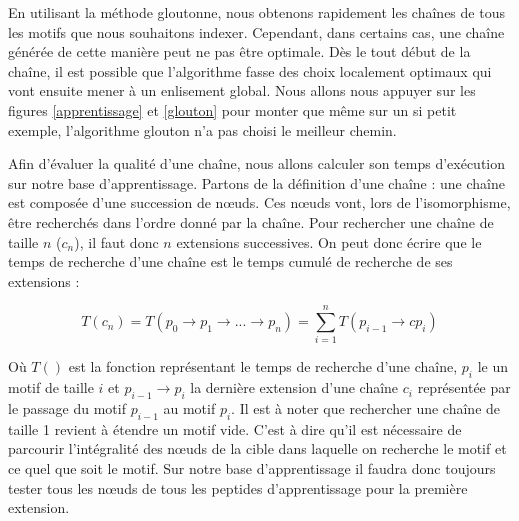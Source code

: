 En utilisant la méthode gloutonne, nous obtenons rapidement les chaînes de tous les motifs que nous souhaitons indexer.
Cependant, dans certains cas, une chaîne générée de cette manière peut ne pas être optimale.
Dès le tout début de la chaîne, il est possible que l'algorithme fasse des choix localement optimaux qui vont ensuite mener à un enlisement global.
Nous allons nous appuyer sur les figures \ref{apprentissage} et \ref{glouton} pour monter que même sur un si petit exemple, l'algorithme glouton n'a pas choisi le meilleur chemin.

Afin d'évaluer la qualité d'une chaîne, nous allons calculer son temps d'exécution sur notre base d'apprentissage.
Partons de la définition d'une chaîne : une chaîne est composée d'une succession de n\oe{}uds.
Ces n\oe{}uds vont, lors de l'isomorphisme, être recherchés dans l'ordre donné par la chaîne.
Pour rechercher une chaîne de taille $n$ ($c_n$), il faut donc $n$ extensions successives.
On peut donc écrire que le temps de recherche d'une chaîne est le temps cumulé de recherche de ses extensions :

\begin{equation}
 T(c_n) = T(p_0 \rightarrow p_1 \rightarrow ... \rightarrow p_n) = \sum_{i=1}^n T(p_{i-1} \rightarrow cp_i)
\end{equation}

Où $T()$ est la fonction représentant le temps de recherche d'une chaîne, $p_i$ le un motif de taille $i$ et $p_{i-1} \rightarrow p_i$ la dernière extension d'une chaîne $c_i$ représentée par le passage du motif $p_{i-1}$ au motif $p_i$.
Il est à noter que rechercher une chaîne de taille 1 revient à étendre un motif vide.
C'est à dire qu'il est nécessaire de parcourir l'intégralité des n\oe{}uds de la cible dans laquelle on recherche le motif et ce quel que soit le motif.
Sur notre base d'apprentissage il faudra donc toujours tester tous les n\oe{}uds de tous les peptides d'apprentissage pour la première extension.
% 

